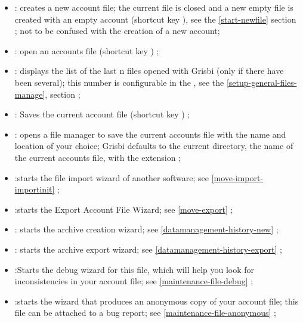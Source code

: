 
\begin{itemize}
	\item {} : creates a new account file; the current file is closed and a new empty file is created with an empty account (shortcut key ),  see the \vref{start-newfile} section ; not to be confused with the creation of a new account;
	\item {} : open an accounts file  (shortcut key  ) ;
	\item {} : displays the list of the last n files opened with Grisbi (only if there have been several); this number is configurable in the , see the \vref{setup-general-files-manage},  section ;
	\item {} : Saves the current account file  (shortcut key ) ;
	\item {} : opens a file manager to save the current accounts file with the name and location of your choice; Grisbi defaults to the current directory, the name of the current accounts file, with the  extension ;
	\item {} :starts the file import wizard of another software; see  \vref{move-import-importinit} ;
	\item {} :starts the Export Account File Wizard; see \vref{move-export} ;	
	\item {} : starts the archive creation wizard; see \vref{datamanagement-history-new} ;	
	\item {} : starts the archive export wizard; see \vref{datamanagement-history-export} ;
	\item {} :Starts the debug wizard for this file, which will help you look for inconsistencies in your account file; see  \vref{maintenance-file-debug} ;
	\item {} :starts the wizard that produces an anonymous copy of your account file; this file can be attached to a bug report; see \vref{maintenance-file-anonymous} ;	

\end{itemize}
